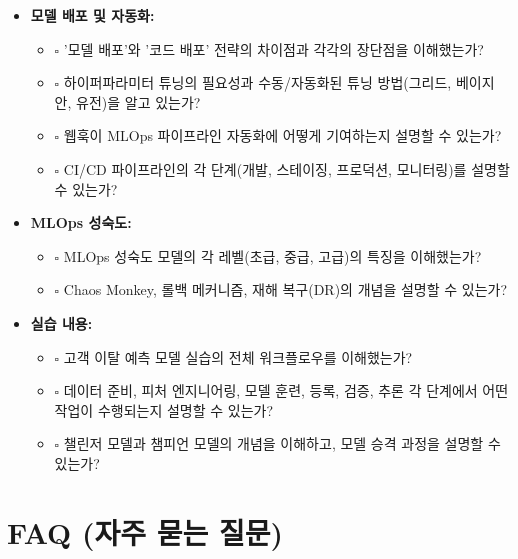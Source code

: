 \documentclass[11pt,a4paper]{article}
\theoremstyle{definition}
\begin{document}
\begin{itemize}
\begin{itemize}
    \end{itemize}
    \item \textbf{모델 배포 및 자동화:}
    \begin{itemize}
        \item $\square$ '모델 배포'와 '코드 배포' 전략의 차이점과 각각의 장단점을 이해했는가?
        \item $\square$ 하이퍼파라미터 튜닝의 필요성과 수동/자동화된 튜닝 방법(그리드, 베이지안, 유전)을 알고 있는가?
        \item $\square$ 웹훅이 MLOps 파이프라인 자동화에 어떻게 기여하는지 설명할 수 있는가?
        \item $\square$ CI/CD 파이프라인의 각 단계(개발, 스테이징, 프로덕션, 모니터링)를 설명할 수 있는가?
    \end{itemize}
    \item \textbf{MLOps 성숙도:}
    \begin{itemize}
        \item $\square$ MLOps 성숙도 모델의 각 레벨(초급, 중급, 고급)의 특징을 이해했는가?
        \item $\square$ Chaos Monkey, 롤백 메커니즘, 재해 복구(DR)의 개념을 설명할 수 있는가?
    \end{itemize}
    \item \textbf{실습 내용:}
    \begin{itemize}
        \item $\square$ 고객 이탈 예측 모델 실습의 전체 워크플로우를 이해했는가?
        \item $\square$ 데이터 준비, 피처 엔지니어링, 모델 훈련, 등록, 검증, 추론 각 단계에서 어떤 작업이 수행되는지 설명할 수 있는가?
        \item $\square$ 챌린저 모델과 챔피언 모델의 개념을 이해하고, 모델 승격 과정을 설명할 수 있는가?
    \end{itemize}
\end{itemize}

\newpage
\section{FAQ (자주 묻는 질문)}
\end{document}
